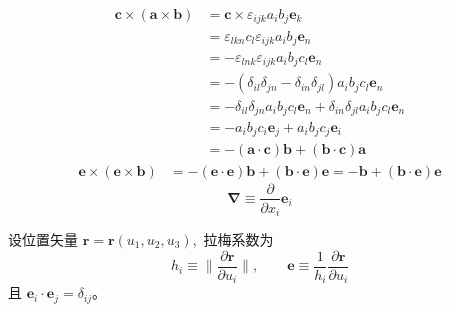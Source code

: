 \begin{align}
    \boldsymbol{c}\times(\boldsymbol{a}\times\boldsymbol{b})
     & =\boldsymbol{c}\times\varepsilon_{ijk} a_i b_j \boldsymbol{e}_k\nonumber                                       \\
     & =\varepsilon_{lkn}c_l\varepsilon_{ijk} a_i b_j \boldsymbol{e}_n\nonumber                                       \\
     & =-\varepsilon_{lnk}\varepsilon_{ijk} a_i b_j c_l\boldsymbol{e}_n\nonumber                                      \\
     & =-(\delta_{il}\delta_{jn}-\delta_{in}\delta_{jl})a_i b_j c_l\boldsymbol{e}_n\nonumber                          \\
     & =-\delta_{il}\delta_{jn}a_i b_j c_l\boldsymbol{e}_n+\delta_{in}\delta_{jl}a_i b_j c_l\boldsymbol{e}_n\nonumber \\
     & =-a_i b_j c_i\boldsymbol{e}_j+a_i b_j c_j\boldsymbol{e}_i\nonumber                                             \\
     & =-(\boldsymbol{a}\cdot\boldsymbol{c})\boldsymbol{b}+(\boldsymbol{b}\cdot\boldsymbol{c})\boldsymbol{a}\label{三个矢量叉乘}
\end{align}
\begin{align}
    \boldsymbol{e}\times(\boldsymbol{e}\times\boldsymbol{b}) & =-(\boldsymbol{e}\cdot\boldsymbol{e})\boldsymbol{b}+(\boldsymbol{b}\cdot\boldsymbol{e})\boldsymbol{e}=-\boldsymbol{b}+(\boldsymbol{b}\cdot\boldsymbol{e})\boldsymbol{e}
\end{align}
\begin{equation}
    \boldsymbol{\nabla}\equiv\frac{\partial}{\partial x_i}\boldsymbol{e}_i
\end{equation}

设位置矢量 $\boldsymbol r=\boldsymbol r(u_1,u_2,u_3)$, \,拉梅系数为
\[
h_i\equiv\Big\|\frac{\partial\boldsymbol r}{\partial u_i}\Big\|,\qquad
{\boldsymbol e}\equiv\frac{1}{h_i}\frac{\partial\boldsymbol r}{\partial u_i}
\]
且 ${\boldsymbol e}_i\cdot{\boldsymbol e}_j=\delta_{ij}$。

